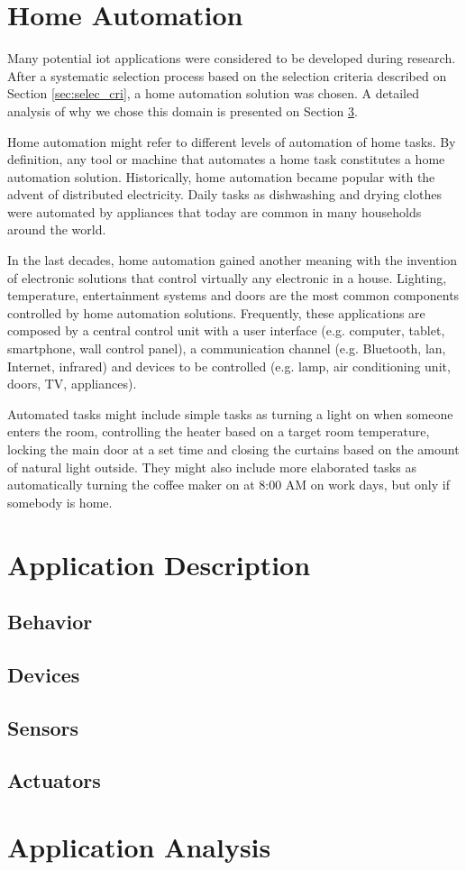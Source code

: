\section{Home Automation}

Many potential \ac{iot} applications were considered to be developed during research. After a systematic selection process based on the selection criteria described on Section \ref{sec:selec_cri}, a home automation solution was chosen. A detailed analysis of why we chose this domain is presented on Section \ref{sec:app_analysis}.

Home automation might refer to different levels of automation of home tasks. By definition, any tool or machine that automates a home task constitutes a home automation solution. Historically, home automation became popular with the advent of distributed electricity. Daily tasks as dishwashing and drying clothes were automated by appliances that today are common in many households around the world.

In the last decades, home automation gained another meaning with the invention of electronic solutions that control virtually any electronic in a house. Lighting, temperature, entertainment systems and doors are the most common components controlled by home automation solutions. Frequently, these applications are composed by a central control unit with a user interface (e.g. computer, tablet, smartphone, wall control panel), a communication channel (e.g. Bluetooth, \acs{lan}, Internet, infrared) and devices to be controlled (e.g. lamp, air conditioning unit, doors, TV, appliances).

Automated tasks might include simple tasks as turning a light on when someone enters the room, controlling the heater based on a target room temperature, locking the main door at a set time and closing the curtains based on the amount of natural light outside. They might also include more elaborated tasks as automatically turning the coffee maker on at 8:00 AM on work days, but only if somebody is home.

\section{Application Description}
\subsection{Behavior}
\subsection{Devices}
\subsection{Sensors}
\subsection{Actuators}

\section{Application Analysis}\label{sec:app_analysis}
